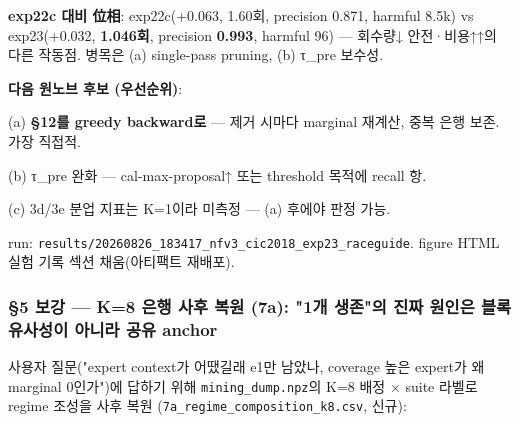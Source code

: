 \textbf{exp22c 대비 位相}: exp22c(+\allowbreak{}0.063, 1.60회, precision 0.871, harmful 8.5k) vs exp23(+\allowbreak{}0.032, \textbf{1.046회}, precision \textbf{0.993}, harmful 96) — 회수량↓ 안전·비용↑↑의 다른 작동점. 병목은 (a) single-pass pruning, (b) τ\_\allowbreak{}pre 보수성.

\textbf{다음 원노브 후보 (우선순위)}:

\par\noindent \textbullet\enspace (a) \textbf{§12를 greedy backward로} — 제거 시마다 marginal 재계산, 중복 은행 보존. 가장 직접적.


\par\noindent \textbullet\enspace (b) τ\_\allowbreak{}pre 완화 — cal-max-proposal↑ 또는 threshold 목적에 recall 항.


\par\noindent \textbullet\enspace (c) 3d/\allowbreak{}3e 분업 지표는 K=\allowbreak{}1이라 미측정 — (a) 후에야 판정 가능.


run: \texttt{results/\allowbreak{}\allowbreak{}20260826\allowbreak{}\_\allowbreak{}\allowbreak{}183417\_\allowbreak{}\allowbreak{}nfv3\_\allowbreak{}\allowbreak{}cic\allowbreak{}2018\_\allowbreak{}\allowbreak{}exp\allowbreak{}23\_\allowbreak{}\allowbreak{}raceg\allowbreak{}uide}. figure HTML 실험 기록 섹션 채움(아티팩트 재배포).

\subsubsection{§5 보강 — K=\allowbreak{}8 은행 사후 복원 (7a): "1개 생존"의 진짜 원인은 블록 유사성이 아니라 공유 anchor}
사용자 질문("expert context가 어땠길래 e1만 남았나, coverage 높은 expert가 왜 marginal 0인가")에 답하기 위해 \texttt{mining\_\allowbreak{}\allowbreak{}d\allowbreak{}ump.\allowbreak{}npz}의 K=\allowbreak{}8 배정 × suite 라벨로 regime 조성을 사후 복원 (\texttt{7a\_\allowbreak{}\allowbreak{}regim\allowbreak{}e\_\allowbreak{}\allowbreak{}compos\allowbreak{}ition\_\allowbreak{}\allowbreak{}k8\allowbreak{}.\allowbreak{}csv}, 신규):

